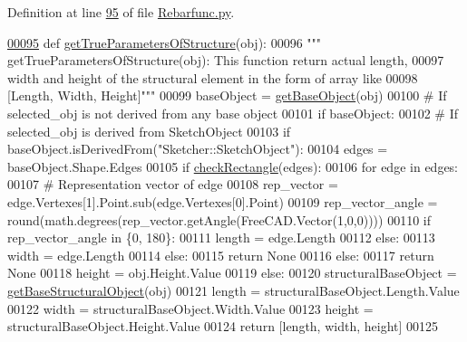 Definition at line \hyperlink{Rebarfunc_8py_source_l00095}{95} of file \hyperlink{Rebarfunc_8py_source}{Rebarfunc.\+py}.


\begin{DoxyCode}
\hypertarget{namespaceRebarfunc.tex_l00095}{}\hyperlink{namespaceRebarfunc_a56b5187c8b2c8bf1b14b4fc88eb6d54c}{00095} \textcolor{keyword}{def }\hyperlink{namespaceRebarfunc_a56b5187c8b2c8bf1b14b4fc88eb6d54c}{getTrueParametersOfStructure}(obj):
00096     \textcolor{stringliteral}{""" getTrueParametersOfStructure(obj): This function return actual length,}
00097 \textcolor{stringliteral}{    width and height of the structural element in the form of array like}
00098 \textcolor{stringliteral}{    [Length, Width, Height]"""}
00099     baseObject = \hyperlink{namespaceRebarfunc_a7169bcadefe75626e6cfb7549b1deb4b}{getBaseObject}(obj)
00100     \textcolor{comment}{# If selected\_obj is not derived from any base object}
00101     \textcolor{keywordflow}{if} baseObject:
00102         \textcolor{comment}{# If selected\_obj is derived from SketchObject}
00103         \textcolor{keywordflow}{if} baseObject.isDerivedFrom(\textcolor{stringliteral}{"Sketcher::SketchObject"}):
00104             edges = baseObject.Shape.Edges
00105             \textcolor{keywordflow}{if} \hyperlink{namespaceRebarfunc_a24ab60160ea54e86c0ce1b727621bf71}{checkRectangle}(edges):
00106                 \textcolor{keywordflow}{for} edge \textcolor{keywordflow}{in} edges:
00107                     \textcolor{comment}{# Representation vector of edge}
00108                     rep\_vector = edge.Vertexes[1].Point.sub(edge.Vertexes[0].Point)
00109                     rep\_vector\_angle = round(math.degrees(rep\_vector.getAngle(FreeCAD.Vector(1,0,0))))
00110                     \textcolor{keywordflow}{if} rep\_vector\_angle \textcolor{keywordflow}{in} \{0, 180\}:
00111                         length = edge.Length
00112                     \textcolor{keywordflow}{else}:
00113                         width = edge.Length
00114             \textcolor{keywordflow}{else}:
00115                 \textcolor{keywordflow}{return} \textcolor{keywordtype}{None}
00116         \textcolor{keywordflow}{else}:
00117             \textcolor{keywordflow}{return} \textcolor{keywordtype}{None}
00118         height = obj.Height.Value
00119     \textcolor{keywordflow}{else}:
00120         structuralBaseObject = \hyperlink{namespaceRebarfunc_a20bba2119d962302eada384246cd6270}{getBaseStructuralObject}(obj)
00121         length = structuralBaseObject.Length.Value
00122         width = structuralBaseObject.Width.Value
00123         height = structuralBaseObject.Height.Value
00124     \textcolor{keywordflow}{return} [length, width, height]
00125 
\end{DoxyCode}


